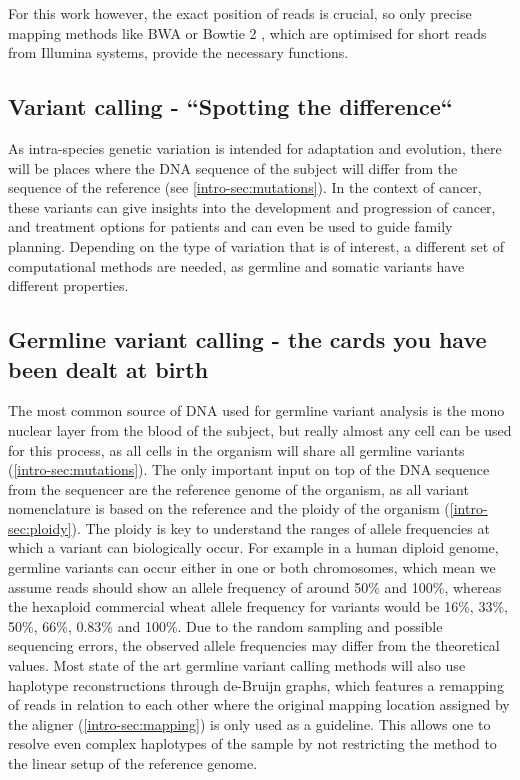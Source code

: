 For this work however, the exact position of reads is crucial, so only precise mapping methods like BWA \cite{Li2013} or Bowtie 2 \cite{Langmead2018}, which are optimised for short reads from Illumina systems, provide the necessary functions.


\subsection[Variant calling]{Variant calling - ``Spotting the difference``}
\label{intro-sec:variantcalling}
As intra-species genetic variation is intended for adaptation and evolution, there will be places where the DNA sequence of the subject will differ from the sequence of the reference (see \autoref{intro-sec:mutations}). In the context of cancer, these variants can give insights into the development and progression of cancer, and treatment options for patients and can even be used to guide family planning. Depending on the type of variation that is of interest, a different set of computational methods are needed, as germline and somatic variants have different properties.

\subsection[Germline]{Germline variant calling - the cards you have been dealt at birth}
\label{intro-sec:germlinecalling}
The most common source of DNA used for germline variant analysis is the mono nuclear layer from the blood of the subject, but really almost any cell can be used for this process, as all cells in the organism will share all germline variants (\autoref{intro-sec:mutations}). The only important input on top of the DNA sequence from the sequencer are the reference genome of the organism, as all variant nomenclature is based on the reference and the ploidy of the organism (\autoref{intro-sec:ploidy}). The ploidy is key to understand the ranges of allele frequencies at which a variant can biologically occur. For example in a human diploid genome, germline variants can occur either in one or both chromosomes, which mean we assume reads should show an allele frequency of around 50\% and 100\%, whereas the hexaploid commercial wheat \cite{Mayer2014} allele frequency for variants would be 16\%, 33\%, 50\%, 66\%, 0.83\% and 100\%. Due to the random sampling and possible sequencing errors, the observed allele frequencies may differ from the theoretical values. 
Most state of the art germline variant calling methods will also use haplotype reconstructions through de-Bruijn graphs, which features a remapping of reads in relation to each other \cite{Garrison2012,Lai2016,Kim2018,Benjamin2019,Cooke2021} where the original mapping location assigned by the aligner (\autoref{intro-sec:mapping}) is only used as a guideline. This allows one to resolve even complex haplotypes of the sample by not restricting the method to the linear setup of the reference genome.


